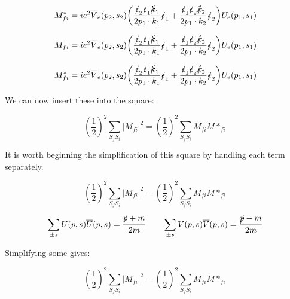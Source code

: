 \documentclass[a4]{article}
\begin{document}
    \begin{equation}
        M_{fi}^* = i e^2 \overline{V}_e (p_2, s_2) \bigg( \frac{\slashed{\epsilon}_2 \slashed{\epsilon}_1 \slashed{k}_1}{2 p_1 \cdot k_1} \slashed{\epsilon}_1  + \frac{\slashed{\epsilon}_1 \slashed{\epsilon}_2 \slashed{k}_2}{2 p_1 \cdot k_2} \slashed{\epsilon}_2 \bigg) U_e (p_1, s_1)
    \end{equation}

    \begin{equation}
        M_{fi} = i e^2 \overline{V}_e (p_2, s_2) \bigg( \frac{\slashed{\epsilon}_2 \slashed{\epsilon}_1 \slashed{k}_1}{2 p_1 \cdot k_1} \slashed{\epsilon}_1  + \frac{\slashed{\epsilon}_1 \slashed{\epsilon}_2 \slashed{k}_2}{2 p_1 \cdot k_2} \slashed{\epsilon}_2 \bigg) U_e (p_1, s_1)
    \end{equation}

    \begin{equation}
        M_{fi}^* = i e^2 \overline{V}_e (p_2, s_2) \bigg( \frac{\slashed{\epsilon}_2 \slashed{\epsilon}_1 \slashed{k}_1}{2 p_1 \cdot k_1} \slashed{\epsilon}_1  + \frac{\slashed{\epsilon}_1 \slashed{\epsilon}_2 \slashed{k}_2}{2 p_1 \cdot k_2} \slashed{\epsilon}_2 \bigg) U_e (p_1, s_1)
    \end{equation}

    We can now insert these into the square:

    \begin{equation}
        (\frac{1}{2})^2 \sum_{S_f S_i} |M_{f i}|^2 = (\frac{1}{2})^2 \sum_{S_f S_i} M_{fi} M*_{fi}
    \end{equation}

    It is worth beginning the simplification of this square by handling each term separately.

    \begin{equation}
        (\frac{1}{2})^2 \sum_{S_f S_i} |M_{f i}|^2 = (\frac{1}{2})^2 \sum_{S_f S_i} M_{fi} M*_{fi}
    \end{equation}

    \begin{equation}
        \sum_{\pm s} U (p, s) \overline{U} (p, s) = \frac{\slashed{p} + m}{2m} \qquad \sum_{\pm s} V (p, s) \overline{V} (p, s) = \frac{\slashed{p} - m}{2m}
    \end{equation}

    Simplifying some gives:

    \begin{equation}
        (\frac{1}{2})^2 \sum_{S_f S_i} |M_{f i}|^2 = (\frac{1}{2})^2 \sum_{S_f S_i} M_{fi} M*_{fi}
    \end{equation}
\end{document}
